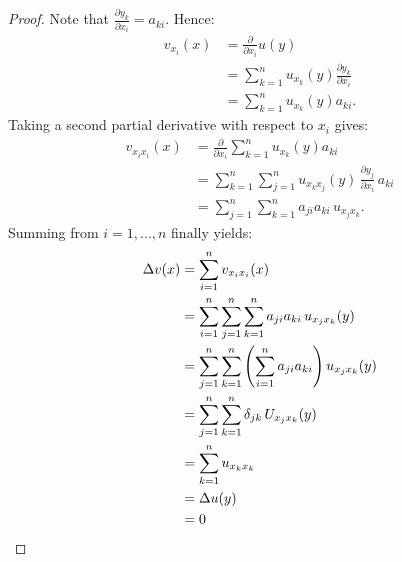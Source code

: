     \begin{proof}
        Note that $\frac{\partial y_k}{\partial x_i} = a_{ki}$. Hence:
            \begin{equation*}
            \begin{split}
                v_{x_i}(x)
                & = \frac{\partial}{\partial x_i} u(y) \\
                & = \sum_{k = 1}^n u_{x_k}(y)\frac{\partial y_k}{\partial x_i} \\
                & = \sum_{k = 1}^n u_{x_k}(y) a_{ki}.
            \end{split}
            \end{equation*}
        Taking a second partial derivative with respect to $x_i$ gives:
            \begin{equation*}
            \begin{split}
                v_{x_i x_i}(x)
                & = \frac{\partial}{\partial x_i}\sum_{k = 1}^n u_{x_k}(y) a_{ki}\\
                &= \sum_{k=1}^n \sum_{j=1}^n u_{x_k x_j}(y)\,\frac{\partial y_j}{\partial x_i}\,a_{ki} \\
                &= \sum_{j=1}^n \sum_{k=1}^n a_{ji}a_{ki}\,u_{x_j x_k}.
            \end{split}
            \end{equation*}
        Summing from $i=1,...,n$ finally yields:
            \begin{equation*}
            \begin{split}
                \Delta v(x)
                &= \sum_{i=1}^n v_{x_i x_i}(x) \\
                &= \sum_{i=1}^n \sum_{j=1}^n \sum_{k=1}^n a_{ji}a_{ki}\,u_{x_j x_k}(y) \\
                &= \sum_{j=1}^n \sum_{k=1}^n \left( \sum_{i=1}^n a_{ji}a_{ki} \right) u_{x_j x_k}(y) \\
                &= \sum_{j=1}^n \sum_{k=1}^n \delta_{jk}\,U_{x_j x_k}(y) \\
                &= \sum_{k=1}^n u_{x_k x_k} \\
                &= \Delta u(y) \\
                &= 0 \qedhere
            \end{split}
            \end{equation*}
    \end{proof}

